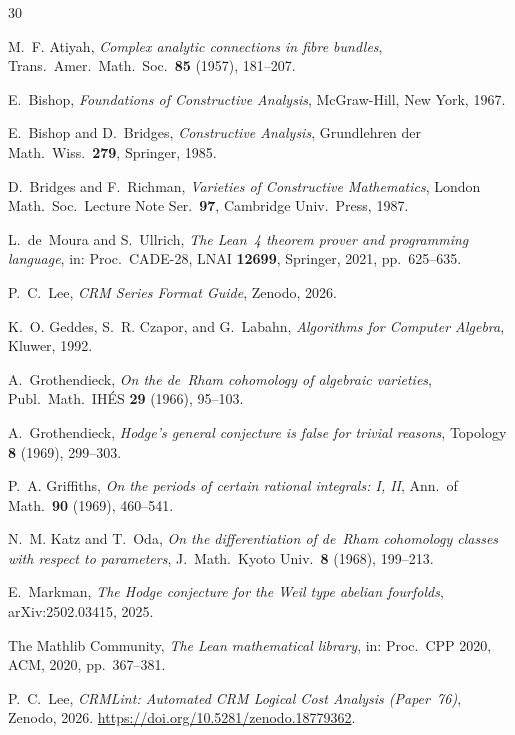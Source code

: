 \documentclass[11pt]{article}
\theoremstyle{plain}
\theoremstyle{definition}
\theoremstyle{remark}
\begin{document}
\begin{thebibliography}{30}

M.~F. Atiyah,
\emph{Complex analytic connections in fibre bundles},
Trans.\ Amer.\ Math.\ Soc.\ \textbf{85} (1957), 181--207.

E.~Bishop,
\emph{Foundations of Constructive Analysis},
McGraw-Hill, New York, 1967.

E.~Bishop and D.~Bridges,
\emph{Constructive Analysis},
Grundlehren der Math.\ Wiss.\ \textbf{279}, Springer, 1985.

D.~Bridges and F.~Richman,
\emph{Varieties of Constructive Mathematics},
London Math.\ Soc.\ Lecture Note Ser.\ \textbf{97}, Cambridge Univ.\ Press, 1987.

L.~de~Moura and S.~Ullrich,
\emph{The Lean~4 theorem prover and programming language},
in: Proc.\ CADE-28, LNAI \textbf{12699}, Springer, 2021, pp.~625--635.

P.~C.~Lee,
\emph{CRM Series Format Guide},
Zenodo, 2026.

K.~O. Geddes, S.~R. Czapor, and G.~Labahn,
\emph{Algorithms for Computer Algebra},
Kluwer, 1992.

A.~Grothendieck,
\emph{On the de~Rham cohomology of algebraic varieties},
Publ.\ Math.\ IH\'ES \textbf{29} (1966), 95--103.

A.~Grothendieck,
\emph{Hodge's general conjecture is false for trivial reasons},
Topology \textbf{8} (1969), 299--303.

P.~A. Griffiths,
\emph{On the periods of certain rational integrals: I, II},
Ann.\ of Math.\ \textbf{90} (1969), 460--541.

N.~M. Katz and T.~Oda,
\emph{On the differentiation of de~Rham cohomology classes with respect to
parameters},
J.~Math.\ Kyoto Univ.\ \textbf{8} (1968), 199--213.

E.~Markman,
\emph{The Hodge conjecture for the Weil type abelian fourfolds},
arXiv:2502.03415, 2025.

The Mathlib Community,
\emph{The Lean mathematical library},
in: Proc.\ CPP 2020, ACM, 2020, pp.~367--381.

P.~C.~Lee,
\emph{CRMLint: Automated CRM Logical Cost Analysis (Paper~76)},
Zenodo, 2026.
\url{https://doi.org/10.5281/zenodo.18779362}.


\end{thebibliography}
\end{document}
